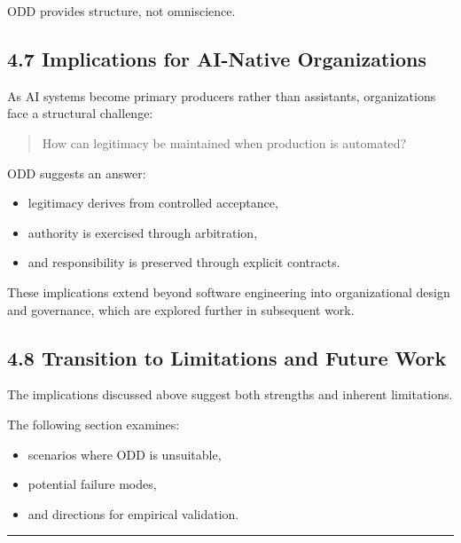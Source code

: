\documentclass[
]{article}
\begin{document}
ODD provides structure, not omniscience.

\hypertarget{47-implications-for-ai-native-organizations}{%
\subsection{4.7 Implications for AI-Native
Organizations}\label{47-implications-for-ai-native-organizations}}

As AI systems become primary producers rather than assistants,
organizations face a structural challenge:

\begin{quote}
How can legitimacy be maintained when production is automated?
\end{quote}

ODD suggests an answer:

\begin{itemize}
\item
  legitimacy derives from controlled acceptance,
\item
  authority is exercised through arbitration,
\item
  and responsibility is preserved through explicit contracts.
\end{itemize}

These implications extend beyond software engineering into
organizational design and governance, which are explored further in
subsequent work.

\hypertarget{48-transition-to-limitations-and-future-work}{%
\subsection{4.8 Transition to Limitations and Future
Work}\label{48-transition-to-limitations-and-future-work}}

The implications discussed above suggest both strengths and inherent
limitations.

The following section examines:

\begin{itemize}
\item
  scenarios where ODD is unsuitable,
\item
  potential failure modes,
\item
  and directions for empirical validation.
\end{itemize}

\begin{center}\rule{0.5\linewidth}{0.5pt}\end{center}
\end{document}
